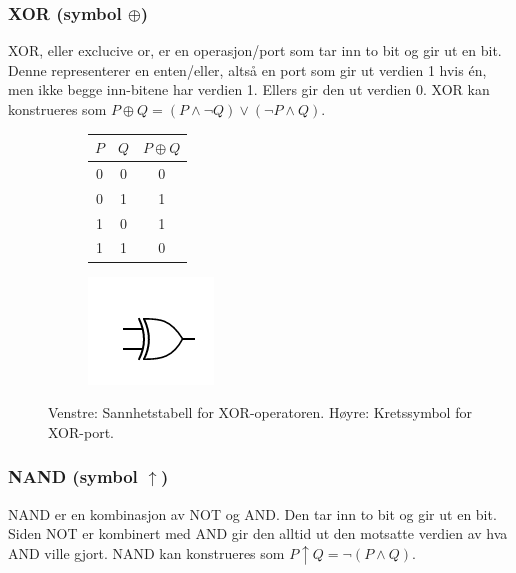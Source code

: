 \subsubsection{XOR (symbol $\oplus$)}
XOR, eller exclucive or, er en operasjon/port som tar inn to bit og gir ut en bit. Denne representerer en enten/eller, altså en port som gir ut verdien 1 hvis \'en, men ikke begge inn-bitene har verdien 1. Ellers gir den ut verdien 0. XOR kan konstrueres som $P\oplus Q = (P\land\neg Q)\lor(\neg P \land Q)$. 
\begin{center}
\begin{figure}[h]
\begin{subfigure}{.3\textwidth}
	\begin{tabular}{|c|c|c|}
	\hline
	$P$ & $Q$ & $P \oplus Q$ \\
	\hline
	0 & 0 & 0\\
	0 & 1 & 1 \\
	1 & 0 & 1 \\
	1 & 1 & 0 \\
	\hline
	\end{tabular}
\end{subfigure}
\begin{subfigure}{.3\textwidth}
	\includegraphics{./gate_xor}
\end{subfigure}
\caption{Venstre: Sannhetstabell for XOR-operatoren. Høyre: Kretssymbol for XOR-port.}
\end{figure}
\end{center}

\subsubsection{NAND (symbol $\uparrow$)}
NAND er en kombinasjon av NOT og AND. Den tar inn to bit og gir ut en bit. Siden NOT er kombinert med AND gir den alltid ut den motsatte verdien av hva AND ville gjort. NAND kan konstrueres som $P \uparrow Q = \neg(P\land Q)$. 

